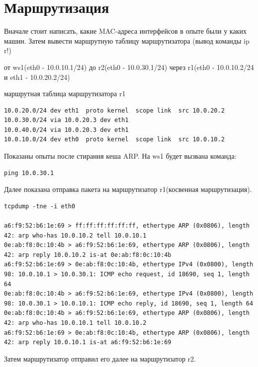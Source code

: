 \documentclass[a4paper,12pt]{article}
\begin{document}
\section{Маршрутизация}


Вначале стоит написать, какие MAC-адреса интерфейсов в опыте были у каких машин.
Затем вывести маршрутную таблицу маршрутизатора (вывод команды ip r!)

от ws1(eth0 - 10.0.10.1/24)
до r2(eth0 - 10.0.30.1/24)
через r1(eth0 - 10.0.10.2/24  и eth1 - 10.0.20.2/24)

маршрутная таблица маршрутизатора r1
\begin{Verbatim}
10.0.20.0/24 dev eth1  proto kernel  scope link  src 10.0.20.2 
10.0.30.0/24 via 10.0.20.3 dev eth1 
10.0.40.0/24 via 10.0.20.3 dev eth1 
10.0.10.0/24 dev eth0  proto kernel  scope link  src 10.0.10.2 
\end{Verbatim}

Показаны опыты после стирания кеша ARP.
На ws1 будет вызвана команда:
\begin{Verbatim}
ping 10.0.30.1
\end{Verbatim}

Далее показана отправка пакета на маршрутизатор r1(косвенная маршрутизация). 

\begin{Verbatim}
tcpdump -tne -i eth0

a6:f9:52:b6:1e:69 > ff:ff:ff:ff:ff:ff, ethertype ARP (0x0806), length 42: arp who-has 10.0.10.2 tell 10.0.10.1
0e:ab:f8:0c:10:4b > a6:f9:52:b6:1e:69, ethertype ARP (0x0806), length 42: arp reply 10.0.10.2 is-at 0e:ab:f8:0c:10:4b
a6:f9:52:b6:1e:69 > 0e:ab:f8:0c:10:4b, ethertype IPv4 (0x0800), length 98: 10.0.10.1 > 10.0.30.1: ICMP echo request, id 18690, seq 1, length 64
0e:ab:f8:0c:10:4b > a6:f9:52:b6:1e:69, ethertype IPv4 (0x0800), length 98: 10.0.30.1 > 10.0.10.1: ICMP echo reply, id 18690, seq 1, length 64
0e:ab:f8:0c:10:4b > a6:f9:52:b6:1e:69, ethertype ARP (0x0806), length 42: arp who-has 10.0.10.1 tell 10.0.10.2
a6:f9:52:b6:1e:69 > 0e:ab:f8:0c:10:4b, ethertype ARP (0x0806), length 42: arp reply 10.0.10.1 is-at a6:f9:52:b6:1e:69
\end{Verbatim}

Затем маршрутизатор отправил его далее на маршрутизатор r2.
\end{document}
